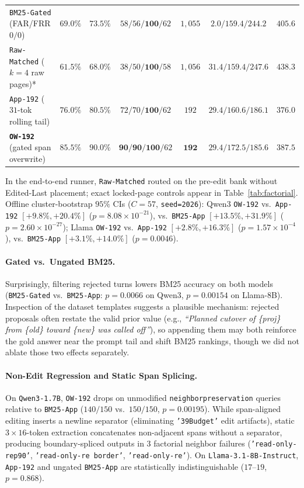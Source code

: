 \documentclass[10pt]{article}
\renewcommand{\_}{\origunderscore\allowbreak}
\begin{document}
\begin{table}[t]
{\begin{tabular}{@{}lcccccc@{}}
\texttt{BM25-Gated} (FAR/FRR $0/0$) & $69.0\%$ & $73.5\%$ & $58 / 56 / \mathbf{100} / 62$ & $1{,}055$ & $2.0 / 159.4 / 244.2$ & $405.6$ \\
\texttt{Raw-Matched} ($k=4$ raw pages)* & $61.5\%$ & $68.0\%$ & $38 / 50 / \mathbf{100} / 58$ & $1{,}056$ & $31.4 / 159.4 / 247.6$ & $438.3$ \\
\texttt{App-192} ($31$-tok rolling tail) & $76.0\%$ & $80.5\%$ & $72 / 70 / \mathbf{100} / 62$ & $192$ & $29.4 / 160.6 / 186.1$ & $376.0$ \\
\textbf{\texttt{OW-192}} (gated span overwrite) & $\mathbf{85.5\%}$ & $\mathbf{90.0\%}$ & $\mathbf{90} / \mathbf{90} / \mathbf{100} / 62$ & $\mathbf{192}$ & $29.4 / 172.5 / \mathbf{185.6}$ & $387.5$ \\
\bottomrule
\end{tabular}%
}
\vspace{2pt}
\parbox{\textwidth}{\footnotesize *In the end-to-end runner, \texttt{Raw-Matched} routed on the pre-edit bank without Edited-Last placement; exact locked-page controls appear in Table~\ref{tab:factorial}. Offline cluster-bootstrap $95\%$ CIs ($C=57$, \texttt{seed=2026}): Qwen3 \texttt{OW-192} vs.\ \texttt{App-192} $[+9.8\%, +20.4\%]$ ($p=8.08\times 10^{-21}$), vs.\ \texttt{BM25-App} $[+13.5\%, +31.9\%]$ ($p=2.60\times 10^{-27}$); Llama \texttt{OW-192} vs.\ \texttt{App-192} $[+2.8\%, +16.3\%]$ ($p=1.57\times 10^{-4}$), vs.\ \texttt{BM25-App} $[+3.1\%, +14.0\%]$ ($p=0.0046$).}
\end{table}

\paragraph{Gated vs.\ Ungated BM25.}
Surprisingly, filtering rejected turns lowers BM25 accuracy on both models (\texttt{BM25-Gated} vs.\ \texttt{BM25-App}: $p=0.0066$ on Qwen3, $p=0.00154$ on Llama-8B). Inspection of the dataset templates suggests a plausible mechanism: rejected proposals often restate the valid prior value (e.g., \emph{``Planned cutover of \{proj\} from \{old\} toward \{new\} was called off''}), so appending them may both reinforce the gold answer near the prompt tail and shift BM25 rankings, though we did not ablate those two effects separately.

\paragraph{Non-Edit Regression and Static Span Splicing.}
On \texttt{Qwen3-1.7B}, \texttt{OW-192} drops on unmodified \texttt{neighbor\_preservation} queries relative to \texttt{BM25-App} ($140/150$ vs.\ $150/150$, $p=0.00195$). While span-aligned editing inserts a newline separator (eliminating \texttt{'39Budget'} edit artifacts), static $3\times 16$-token extraction concatenates non-adjacent spans without a separator, producing boundary-spliced outputs in $3$ factorial neighbor failures (\texttt{'read-only-rep90'}, \texttt{'read-only-re border'}, \texttt{'read-only-re'}). On \texttt{Llama-3.1-8B-Instruct}, \texttt{App-192} and ungated \texttt{BM25-App} are statistically indistinguishable ($17$--$19$, $p=0.868$).
\end{document}
